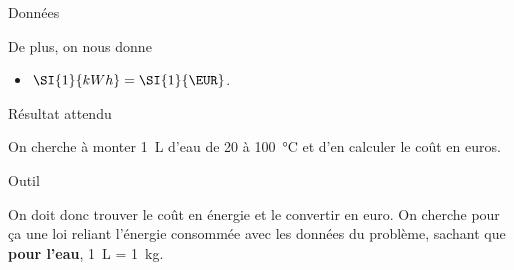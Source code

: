 \documentclass[../main/main.tex]{subfiles}
\begin{document}
\begin{enumerate}
\begin{tcbraster}[raster columns=2, raster equal height=rows]
\begin{NCdefi}[]{Données}
\begin{itemize}
                \end{itemize}
                De plus, on nous donne
                \begin{itemize}
                    \item $ \SI{1}{kWh} = \SI{1}{\EUR}$.
                \end{itemize}
            \end{NCdefi}
            \begin{tcolorbox}[blankest, raster multicolumn=1, space to=\myspace]
                \begin{tcbraster}[raster columns=1]
                    \begin{NCprop}[add to natural height=\myspace]{Résultat attendu}

                        On cherche à monter \SI{1}{L} d'eau de 20 à
                        \SI{100}{\degreeCelsius} et d'en calculer le coût en
                        euros.

                    \end{NCprop}
                    \begin{NCrapp}[]{Outil}

                        On doit donc trouver le coût en énergie et le convertir
                        en euro. On cherche pour ça une loi reliant l'énergie
                        consommée avec les données du problème, sachant que
                        \textbf{pour l'eau}, \SI{1}{L} = \SI{1}{kg}.


\end{NCrapp}
\end{tcbraster}
\end{tcolorbox}
\end{tcbraster}
\end{enumerate}
\end{document}
